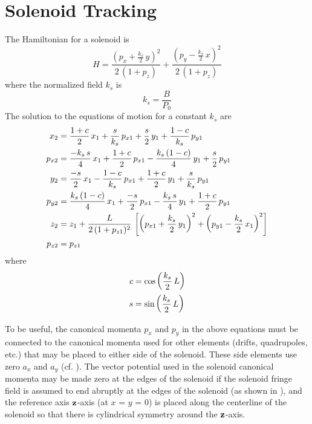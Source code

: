 \section{Solenoid Tracking}
\label{s:solenoid.std}

The Hamiltonian for a solenoid is
\begin{equation}
  H = \frac{ \left( p_x + \frac{k_s}{2} \, y \right)^2}{2 \, (1 + p_z)} + 
  \frac{ \left( p_y - \frac{k_s}{2} \, x \right)^2}{2 \, (1 + p_z)} 
\end{equation}
where the normalized field $k_s$ is
\begin{equation}
  k_s = \frac{B}{P_0}
\end{equation}
The solution to the equations of motion for a constant $k_s$ are
\begin{align}
  x_2    &= \frac{1 + c}{2} \, x_1 + \frac{s}{k_s} \, p_{x1} +
           \frac{s}{2} \, y_1 + \frac{1 - c}{k_s} \, p_{y1} \nonumber \\
  p_{x2} &= \frac{-k_s \, s}{4} \, x_1 + \frac{1 + c}{2} \, p_{x1} - 
           \frac{k_s \, (1 - c)}{4} \, y_1 + \frac{s}{2} \, p_{y1} \nonumber \\
  y_2    &= \frac{-s}{2} \, x_1 - \frac{1 - c}{k_s} \, p_{x1} +
           \frac{1 + c}{2} \, y_1 + \frac{s}{k_s} \, p_{y1} \\      
  p_{y2} &= \frac{k_s \, (1 - c)}{4} \, x_1 + \frac{-s}{2} \, p_{x1} -
            \frac{k_s \, s}{4} \, y_1 + \frac{1 + c}{2} \, p_{y1} \nonumber \\ 
  z_2    &= z_1 + \frac{L}{2 \, (1 + p_{z1})^2} \, 
                   \left[ \left( p_{x1} + \frac{k_s}{2} \, y_1 \right)^2 +
                          \left( p_{y1} - \frac{k_s}{2} \, x_1 \right)^2 \right] \nonumber \\
  p_{z2} &= p_{z1} \nonumber
\end{align}
where
\begin{align}
  c &= \cos \left( \frac{k_s}{2} \, L \right) \nonumber \\
  s &= \sin \left( \frac{k_s}{2} \, L \right)
\end{align}

To be useful, the canonical momenta $p_x$ and $p_y$ in the above
equations must be connected to the canonical momenta used for other
elements (drifts, quadrupoles, etc.) that may be placed to either side
of the solenoid. These side elements use zero $a_x$ and $a_y$
(cf. ). The vector potential used in the solenoid canonical
momenta may be made zero at the edges of the solenoid if the solenoid
fringe field is assumed to end abruptly at the edges of the solenoid
(as shown in ), and the reference axis ${\bf z}$-axis (at
$x$ = $y$ = 0) is placed along the centerline of the solenoid so that
there is cylindrical symmetry around the ${\bf z}$-axis.

